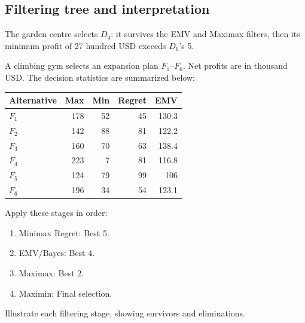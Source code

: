 \subsection*{Filtering tree and interpretation}
\begin{center}
\end{center}
The garden centre selects $D_4$: it survives the EMV and Maximax filters, then its minimum profit of 27 hundred USD exceeds $D_6$'s 5.
\secInicio[sec:q3]

A climbing gym selects an expansion plan $F_1$--$F_6$. Net profits are in thousand USD. The decision statistics are summarized below:
\vspace{-3mm}
\begin{center}\small\setlength{\tabcolsep}{4pt}
	\begin{tabular}{lrrrr}\toprule
		Alternative & Max & Min & Regret & EMV\\ \midrule
		$F_1$ & 178 & 52 & 45 & 130.3\\
		$F_2$ & 142 & 88 & 81 & 122.2\\
		$F_3$ & 160 & 70 & 63 & 138.4\\
		$F_4$ & 223 & 7 & 81 & 116.8\\
		$F_5$ & 124 & 79 & 99 & 106\\
		$F_6$ & 196 & 34 & 54 & 123.1\\
		\bottomrule
	\end{tabular}
\end{center}
\vspace{-3mm}
Apply these stages in order:
\begin{enumerate}[leftmargin=*]
	\item Minimax Regret: Best 5.
	\item EMV/Bayes: Best 4.
	\item Maximax: Best 2.
	\item Maximin: Final selection.
\end{enumerate}
Illustrate each filtering stage, showing survivors and eliminations.
\label{sol:q4table}
